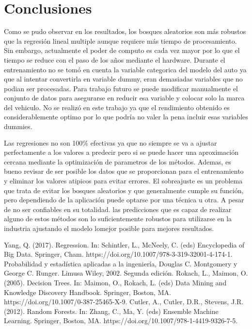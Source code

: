\documentclass[conference]{IEEEtran}
\begin{document}
\section*{Conclusiones}
Como se pudo observar en los resultados, los bosques aleatorios son más robustos que la regresión lineal multiple aunque requiere más tiempo de procesamiento. Sin embargo, actualmente el poder de computo es cada vez mayor por lo que el tiempo se reduce con el paso de los años mediante el hardware. Durante el entrenamiento no se tomó en cuenta la variable categorica del modelo del auto ya que al intentar convertirla en variable dummy, eran demasiadas variables que no podian ser procesadas. Para trabajo futuro se puede modificar manualmente el conjunto de datos para asegurarse en reducir esa variable y colocar solo la marca del vehiculo. No se realizó en este trabajo ya que el rendimiento obtenido es considerablemente optimo por lo que podría no valer la pena incluir esas variables dummies. 

Las regresiones no son 100\% efectivas ya que no siempre se va a ajustar perfectamente a los valores a predecir pero si se puede hacer una aproximación cercana mediante la optimización de parametros de los métodos. Ademas, es bueno revisar de ser posible los datos que se proporcionan para el entrenamiento y eliminar los valores atipicos para evitar errores. El sobreajuste es un problema que trata de evitar los bosques aleatorios y que generalmente cumple su función, pero dependiendo de la aplicación puede optarse por una técnica u otra. A pesar de no ser confiables en su totalidad. las predicciones que es capaz de realizar alguno de estos métodos son lo suficientemente robustos para utilizarse en la industria ajustando el modelo lomejor posible para mejores resultados. 


\begin{thebibliography}{00}
Yang, Q. (2017). Regression. In: Schintler, L., McNeely, C. (eds) Encyclopedia of Big Data. Springer, Cham. https://doi.org/10.1007/978-3-319-32001-4-174-1.
 Probabilidad y estadística aplicadas a la ingeniería, Douglas C. Montgomery y George C. Runger. Limusa Wiley, 2002. Segunda edición.
 Rokach, L., Maimon, O. (2005). Decision Trees. In: Maimon, O., Rokach, L. (eds) Data Mining and Knowledge Discovery Handbook. Springer, Boston, MA. https://doi.org/10.1007/0-387-25465-X-9.
 Cutler, A., Cutler, D.R., Stevens, J.R. (2012). Random Forests. In: Zhang, C., Ma, Y. (eds) Ensemble Machine Learning. Springer, Boston, MA. https://doi.org/10.1007/978-1-4419-9326-7-5.

\end{thebibliography}
\end{document}
